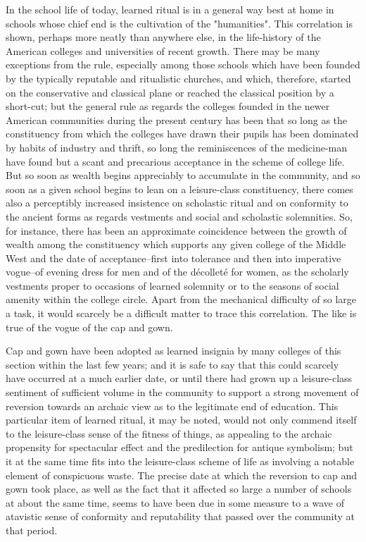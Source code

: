 \documentclass[12pt]{report}
\begin{document}
In the school life of today, learned ritual is in a general way best at
home in schools whose chief end is the cultivation of the "humanities".
This correlation is shown, perhaps more neatly than anywhere else, in
the life-history of the American colleges and universities of recent
growth. There may be many exceptions from the rule, especially among
those schools which have been founded by the typically reputable and
ritualistic churches, and which, therefore, started on the conservative
and classical plane or reached the classical position by a short-cut;
but the general rule as regards the colleges founded in the newer
American communities during the present century has been that so long
as the constituency from which the colleges have drawn their pupils
has been dominated by habits of industry and thrift, so long the
reminiscences of the medicine-man have found but a scant and precarious
acceptance in the scheme of college life. But so soon as wealth begins
appreciably to accumulate in the community, and so soon as a given
school begins to lean on a leisure-class constituency, there comes
also a perceptibly increased insistence on scholastic ritual and on
conformity to the ancient forms as regards vestments and social and
scholastic solemnities. So, for instance, there has been an approximate
coincidence between the growth of wealth among the constituency
which supports any given college of the Middle West and the date of
acceptance--first into tolerance and then into imperative vogue--of
evening dress for men and of the décolleté for women, as the scholarly
vestments proper to occasions of learned solemnity or to the seasons
of social amenity within the college circle. Apart from the mechanical
difficulty of so large a task, it would scarcely be a difficult matter
to trace this correlation. The like is true of the vogue of the cap and
gown.

Cap and gown have been adopted as learned insignia by many colleges of
this section within the last few years; and it is safe to say that this
could scarcely have occurred at a much earlier date, or until there had
grown up a leisure-class sentiment of sufficient volume in the community
to support a strong movement of reversion towards an archaic view as to
the legitimate end of education. This particular item of learned ritual,
it may be noted, would not only commend itself to the leisure-class
sense of the fitness of things, as appealing to the archaic propensity
for spectacular effect and the predilection for antique symbolism;
but it at the same time fits into the leisure-class scheme of life as
involving a notable element of conspicuous waste. The precise date at
which the reversion to cap and gown took place, as well as the fact that
it affected so large a number of schools at about the same time,
seems to have been due in some measure to a wave of atavistic sense
of conformity and reputability that passed over the community at that
period.
\end{document}
